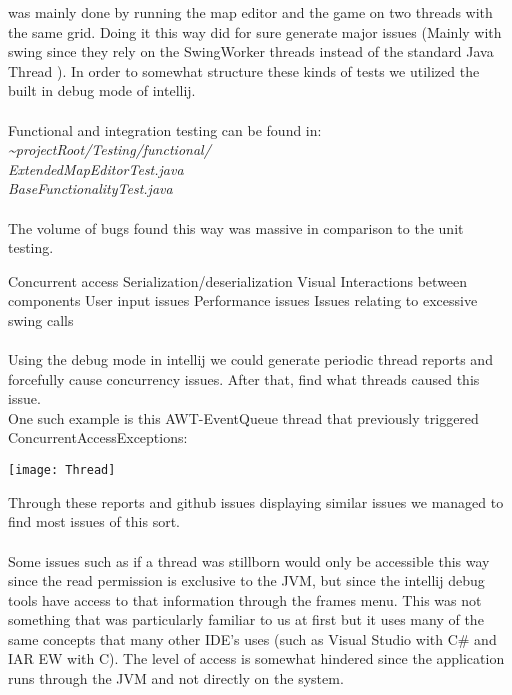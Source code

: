 \documentclass[]{article}
\begin{document}
was mainly done by running the map editor and the game on two threads
with the same grid. Doing it this way did for sure generate major issues
(Mainly with swing since they rely on the SwingWorker threads instead of
the standard Java Thread ). In order to somewhat structure these kinds
of tests we utilized the built in debug mode of intellij.
\\ \\
Functional and integration testing can be found in:
\\
\emph{\textasciitilde{}projectRoot/Testing/functional/}\\
\hspace*{10mm} \emph{ExtendedMapEditorTest.java}\\
\hspace*{10mm} \emph{BaseFunctionalityTest.java}\\ \\
The volume of bugs found this way was massive in comparison to the unit
testing.

Concurrent access
Serialization/deserialization
Visual
Interactions between components
User input issues
Performance issues
Issues relating to excessive swing calls
\\ \\
Using the debug mode in intellij we could generate periodic thread
reports and forcefully cause concurrency issues. After that, find what
threads caused this issue.
\\
One such example is this AWT-EventQueue thread that previously triggered
ConcurrentAccessExceptions:


\begin{center}
\texttt{[image: Thread]}
\end{center}
Through these reports and github issues displaying similar issues we
managed to find most issues of this sort.
\\ \\
Some issues such as if a thread was stillborn would only be accessible
this way since the read permission is exclusive to the JVM, but since
the intellij debug tools have access to that information through the
frames menu. This was not something that was particularly familiar to us
at first but it uses many of the same concepts that many other IDE's
uses (such as Visual Studio with C\# and IAR EW with C). The level of
access is somewhat hindered since the application runs through the JVM
and not directly on the system.
\end{document}
